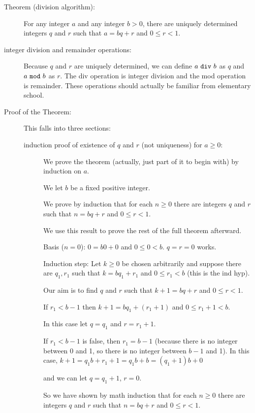 \documentclass[12pt]{article}
\begin{document}
\begin{description}

\item[Theorem (division algorithm):]  For any integer $a$ and any integer $b>0$, there are uniquely determined integers  $q$ and $r$ such that $a=bq+r$ and $0 \leq r <1$.

\item[integer division and remainder operations:]  Because $q$ and $r$ are uniquely determined, we can define
$a \,\,{\tt div} \,\, b$ as $q$ and $a\, \,{\tt mod} \,\, b$ as $r$.  The div operation is integer division and the mod operation is remainder.  These operations should actually be familiar from elementary school.

\item[Proof of the Theorem:]

This falls into three sections:

\begin{description}

\item[induction proof of existence of $q$ and $r$ (not uniqueness) for $a\geq 0$:]

We prove the theorem (actually, just part of it to begin with) by induction on $a$.

We let $b$ be a fixed positive integer.

We prove by induction that for each $n \geq 0$ there are integers $q$ and $r$ such that $n=bq+r$ and $0 \leq r <1$.

We use this result to prove the rest of the full theorem afterward.

Basis ($n=0$):  $0 = b0 + 0$ and $0 \leq 0 < b$. $q=r=0$ works.

Induction step:  Let $k\geq 0$ be chosen arbitrarily and suppose there are $q_1,r_1$ such that $k=bq_1+ r_1$
and $0 \leq r_1 < b$ (this is the ind hyp).

Our aim is to find $q$ and $r$ such that $k+1 = bq+r$ and $0\leq r <1$.

If $r_1<b-1$ then $k+1 = bq_1 + (r_1+1)$ and $0 \leq r_1+1 < b$.

In this case let $q=q_1$ and $r=r_1+1$.

If $r_1 < b-1$ is false, then $r_1 = b-1$ (because there is no integer between 0 and 1, so there is no integer between $b-1$ and 1).  In this case, $k+1 = q_1b + r_1+1 = q_1b + b = (q_1+1)b+0$ 

and we can let $q = q_1+1$, $r=0$.

So we have shown by math induction that for each $n \geq 0$ there are integers $q$ and $r$ such that $n=bq+r$ and $0 \leq r <1$.


\end{description}
\end{description}
\end{document}
